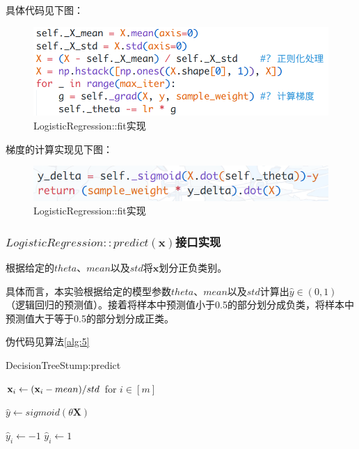 \documentclass{paper}
\begin{document}
具体代码见下图：
\begin{figure}[H]
    \begin{center}
        \includegraphics[scale = 0.35, frame]{images/lf.png}
    \end{center}
    \caption[short]{LogisticRegression::fit实现}
\end{figure}

梯度的计算实现见下图：
\begin{figure}[H]
    \begin{center}
        \includegraphics[scale = 0.35, frame]{images/lg.png}
    \end{center}
    \caption[short]{LogisticRegression::fit实现}
\end{figure}
            
\subsubsection{$LogisticRegression::predict(\mathbf{x})$接口实现} \label{l:p}

根据给定的$theta$、$mean$以及$std$将$\mathbf{x}$划分正负类别。

具体而言，本实验根据给定的模型参数$theta$、$mean$以及$std$计算出$\hat{y} \in (0, 1)$（逻辑回归的预测值）。接着将样本中预测值小于0.5的部分划分成负类，将样本中预测值大于等于0.5的部分划分成正类。

伪代码见算法\ref{alg:5}

\begin{algorithm}[H]
    \label{alg:5}
    \SetAlgoLined
    \caption{DecisionTreeStump:predict}

    $\mathbf{x}_i \leftarrow {(\mathbf{x}_i-mean) \large/ std}$ for $i \in [m]$ 

    $\hat{y} \leftarrow sigmoid(\theta \mathbf{X})$

    {
        {
            $\hat{y}_i \leftarrow -1$
        }{
            $\hat{y}_i \leftarrow 1$
        }
    }

\end{algorithm}
\end{document}
